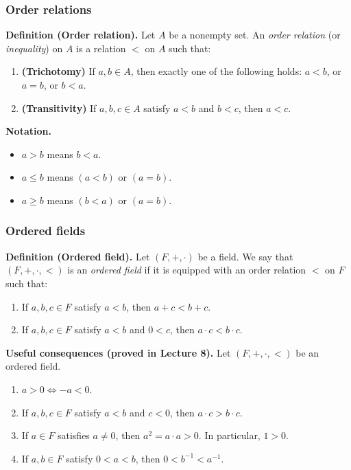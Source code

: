 \documentclass[12pt]{article}
\begin{document}
\subsubsection*{Order relations}
\textbf{Definition (Order relation).}
Let $A$ be a nonempty set. An \emph{order relation} (or \emph{inequality}) on $A$ is a relation $<$ on $A$ such that:
\begin{enumerate}[label=\textbf{(OR\arabic*)}, leftmargin=3em, itemsep=0.25em]
\item \textbf{(Trichotomy)} If $a,b\in A$, then exactly one of the following holds: $a<b$, or $a=b$, or $b<a$.
\item \textbf{(Transitivity)} If $a,b,c\in A$ satisfy $a<b$ and $b<c$, then $a<c$.
\end{enumerate}

\textbf{Notation.}
\begin{itemize}[leftmargin=2em, itemsep=0.25em]
\item $a>b$ means $b<a$.
\item $a\le b$ means $(a<b)$ or $(a=b)$.
\item $a\ge b$ means $(b<a)$ or $(a=b)$.
\end{itemize}

\subsubsection*{Ordered fields}
\textbf{Definition (Ordered field).}
Let $(F,+,\cdot)$ be a field. We say that $(F,+,\cdot,<)$ is an \emph{ordered field} if it is equipped with an order relation $<$ on $F$ such that:
\begin{enumerate}[label=\textbf{(O\arabic*)}, leftmargin=3em, itemsep=0.25em]
\item If $a,b,c\in F$ satisfy $a<b$, then $a+c<b+c$.
\item If $a,b,c\in F$ satisfy $a<b$ and $0<c$, then $a\cdot c<b\cdot c$.
\end{enumerate}

\textbf{Useful consequences (proved in Lecture 8).}
Let $(F,+,\cdot,<)$ be an ordered field.
\begin{enumerate}[label=\textbf{(P\arabic*)}, leftmargin=3em, itemsep=0.25em]
\item $a>0\iff -a<0$.
\item If $a,b,c\in F$ satisfy $a<b$ and $c<0$, then $a\cdot c>b\cdot c$.
\item If $a\in F$ satisfies $a\neq 0$, then $a^2=a\cdot a>0$. In particular, $1>0$.
\item If $a,b\in F$ satisfy $0<a<b$, then $0<b^{-1}<a^{-1}$.
\end{enumerate}
\end{document}
